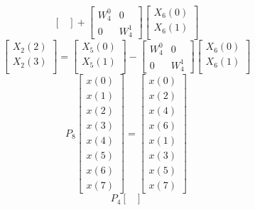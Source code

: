 \documentclass[journal,12pt,twocolumn]{IEEEtran}
\numberwithin{equation}{section}
\renewcommand\thesection{\arabic{section}}
\begin{document}
\begin{enumerate}[label=\arabic*.,ref=\thesection.\theenumi]
\begin{equation}
\begin{bmatrix}
\end{bmatrix}
+
\begin{bmatrix}
W^{0}_{4} & 0\\
0 & W^{1}_{4}
\end{bmatrix}
\begin{bmatrix}
X_{6}(0) \\ 
X_{6}(1) \\ 
\end{bmatrix}
\end{equation}
\begin{equation}
\begin{bmatrix}
X_{2}(2) \\ 
X_{2}(3)\\ 
\end{bmatrix}
=
\begin{bmatrix}
X_{5}(0) \\ 
X_{5}(1)\\ 
\end{bmatrix}
-
\begin{bmatrix}
W^{0}_{4} & 0\\
0 & W^{1}_{4}
\end{bmatrix}
\begin{bmatrix}
X_{6}(0) \\ 
X_{6}(1) \\ 
\end{bmatrix}
\end{equation}
\begin{equation}
P_{8}
\begin{bmatrix}
x(0) \\ 
x(1) \\ 
x(2) \\ 
x(3) \\ 
x(4) \\ 
x(5) \\
x(6) \\
x(7)
\end{bmatrix}
 = 
\begin{bmatrix}
x(0) \\ 
x(2) \\ 
x(4) \\ 
x(6) \\
x(1) \\ 
x(3) \\ 
x(5) \\
x(7)
\end{bmatrix}
\end{equation}
\begin{equation}
P_{4}
\begin{bmatrix}

\end{bmatrix}
\end{equation}
\end{enumerate}
\end{document}
